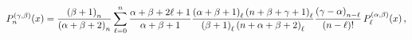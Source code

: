 \[\mathop{P^{(\gamma,\beta)}_{n}\/}\nolimits\!\left(x\right)=\dfrac{\left(\beta+%
1\right)_{n}}{\left(\alpha+\beta+2\right)_{n}}\sum_{\ell=0}^{n}\dfrac{\alpha+%
\beta+2\ell+1}{\alpha+\beta+1}\dfrac{\left(\alpha+\beta+1\right)_{\ell}\left(n%
+\beta+\gamma+1\right)_{\ell}}{\left(\beta+1\right)_{\ell}\left(n+\alpha+\beta%
+2\right)_{\ell}}\dfrac{\left(\gamma-\alpha\right)_{n-\ell}}{(n-\ell)!}\mathop%
{P^{(\alpha,\beta)}_{\ell}\/}\nolimits\!\left(x\right),\]